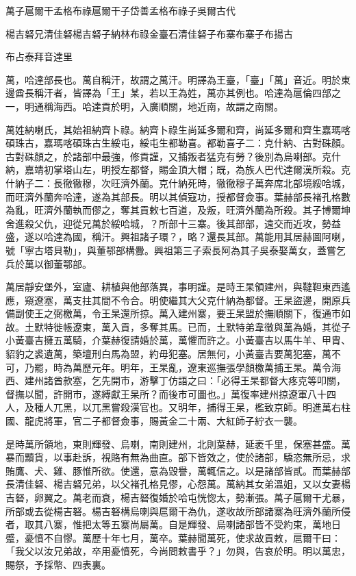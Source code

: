 
\begin{pinyinscope}
萬子扈爾干孟格布祿扈爾干子岱善孟格布祿子吳爾古代

楊吉砮兄清佳砮楊吉砮子納林布祿金臺石清佳砮子布寨布寨子布揚古

布占泰拜音達里

萬，哈達部長也。萬自稱汗，故謂之萬汗。明譯為王臺，「臺」「萬」音近。明於東邊酋長稱汗者，皆譯為「王」某，若以王為姓，萬亦其例也。哈達為扈倫四部之一，明通稱海西。哈達貢於明，入廣順關，地近南，故謂之南關。

萬姓納喇氏，其始祖納齊卜祿。納齊卜祿生尚延多爾和齊，尚延多爾和齊生嘉瑪喀碩珠古，嘉瑪喀碩珠古生綏屯，綏屯生都勒喜。都勒喜子二：克什納、古對硃顏。古對硃顏之，於諸部中最強，修貢謹，又捕叛者猛克有勞？後別為烏喇部。克什納，嘉靖初掌塔山左，明授左都督，賜金頂大帽；既，為族人巴代達爾漢所殺。克什納子二：長徹徹穆，次旺濟外蘭。克什納死時，徹徹穆子萬奔席北部境綏哈城，而旺濟外蘭奔哈達，遂為其部長。明以其偵寇功，授都督僉事。葉赫部長褚孔格數為亂，旺濟外蘭執而僇之，奪其貢敕七百道，及叛，旺濟外蘭為所殺。其子博爾坤舍進殺父仇，迎從兄萬於綏哈城，？所部十三寨。後其部部，遠交而近攻，勢益盛，遂以哈達為國，稱汗。興祖諸子環？，略？還長其部。萬能用其居赫圖阿喇，號「寧古塔貝勒」，與董鄂部構釁。興祖第三子索長阿為其子吳泰娶萬女，蓋嘗乞兵於萬以御董鄂部。

萬居靜安堡外，室廬、耕植與他部落異，事明謹。是時王杲領建州，與韃靼東西遙應，窺遼塞，萬支拄其間不令合。明使繼其大父克什納為都督。王杲盜邊，開原兵備副使王之弼檄萬，令王杲還所掠。萬入建州寨，要王杲盟於撫順關下，復通市如故。土默特徙帳遼東，萬入貢，多奪其馬。已而，土默特弟韋徵與萬為婚，其從子小黃臺吉擁五萬騎，介葉赫復請婚於萬，萬懼而許之。小黃臺吉以馬牛羊、甲胄、貂豹之裘遺萬，築壇刑白馬為盟，約毋犯塞。居無何，小黃臺吉要萬犯塞，萬不可，乃罷，時為萬歷元年。明年，王杲亂，遼東巡撫張學顏檄萬捕王杲。萬令海西、建州諸酋款塞，乞先開市，游擊丁仿語之曰：「必得王杲都督大疼克等叩關，督撫以聞，許開市，遂縛獻王杲所？而後市可圖也。」萬復率建州掠遼軍八十四人，及種人兀黑，以兀黑嘗殺漢官也。又明年，捕得王杲，檻致京師。明進萬右柱國、龍虎將軍，官二子都督僉事，賜黃金二十兩、大紅師子紵衣一襲。

是時萬所領地，東則輝發、烏喇，南則建州，北則葉赫，延袤千里，保塞甚盛。萬暴而黷貨，以事赴訴，視賂有無為曲直。部下皆效之，使於諸部，驕恣無所忌，求賄鷹、犬、雞、豚惟所欲。使還，意為毀譽，萬輒信之。以是諸部皆貳。而葉赫部長清佳砮、楊吉砮兄弟，以父褚孔格見僇，心怨萬。萬納其女弟溫姐，又以女妻楊吉砮，卵翼之。萬老而衰，楊吉砮復婚於哈屯恍惚太，勢漸張。萬子扈爾干尤暴，所部或去從楊吉砮。楊吉砮構烏喇與扈爾干為仇，遂收故所部諸寨為旺濟外蘭所侵者，取其八寨，惟把太等五寨尚屬萬。自是輝發、烏喇諸部皆不受約束，萬地日蹙，憂憤不自憀。萬歷十年七月，萬卒。葉赫聞萬死，使求故貢敕，扈爾干曰：「我父以汝兄弟故，卒用憂憤死，今尚問敕書乎？」勿與，告哀於明。明以萬忠，賜祭，予採幣、四表裏。


\end{pinyinscope}
